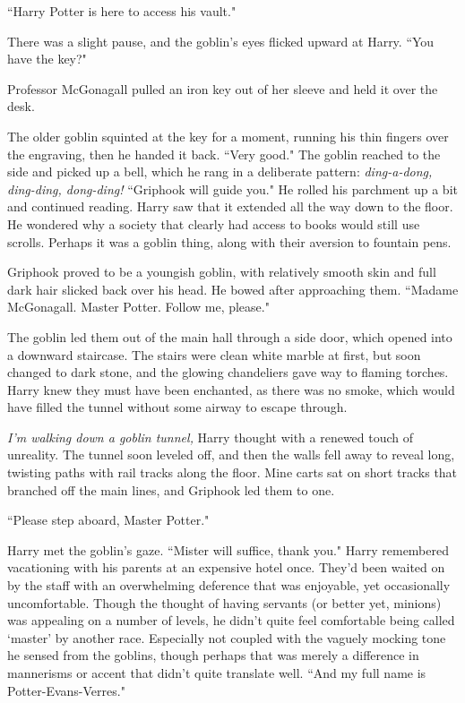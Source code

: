 ``Harry Potter is here to access his vault."

There was a slight pause, and the goblin's eyes flicked upward at Harry. ``You have the key?"

Professor McGonagall pulled an iron key out of her sleeve and held it over the desk.

The older goblin squinted at the key for a moment, running his thin fingers over the engraving, then he handed it back. ``Very good." The goblin reached to the side and picked up a bell, which he rang in a deliberate pattern: \emph{ding-a-dong, ding-ding, dong-ding!} ``Griphook will guide you." He rolled his parchment up a bit and continued reading. Harry saw that it extended all the way down to the floor. He wondered why a society that clearly had access to books would still use scrolls. Perhaps it was a goblin thing, along with their aversion to fountain pens.

Griphook proved to be a youngish goblin, with relatively smooth skin and full dark hair slicked back over his head. He bowed after approaching them. ``Madame McGonagall. Master Potter. Follow me, please."

The goblin led them out of the main hall through a side door, which opened into a downward staircase. The stairs were clean white marble at first, but soon changed to dark stone, and the glowing chandeliers gave way to flaming torches. Harry knew they must have been enchanted, as there was no smoke, which would have filled the tunnel without some airway to escape through.

\emph{I'm walking down a goblin tunnel,} Harry thought with a renewed touch of unreality. The tunnel soon leveled off, and then the walls fell away to reveal long, twisting paths with rail tracks along the floor. Mine carts sat on short tracks that branched off the main lines, and Griphook led them to one.

``Please step aboard, Master Potter."

Harry met the goblin's gaze. ``Mister will suffice, thank you." Harry remembered vacationing with his parents at an expensive hotel once. They'd been waited on by the staff with an overwhelming deference that was enjoyable, yet occasionally uncomfortable. Though the thought of having servants (or better yet, minions) was appealing on a number of levels, he didn't quite feel comfortable being called `master' by another race. Especially not coupled with the vaguely mocking tone he sensed from the goblins, though perhaps that was merely a difference in mannerisms or accent that didn't quite translate well. ``And my full name is Potter-Evans-Verres."

